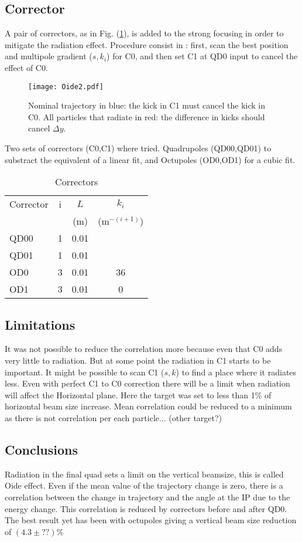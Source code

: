 \subsection{Corrector}
A pair of correctors, as in Fig. (\ref{f:corrector}), is added to the strong focusing in order to mitigate the radiation effect. Procedure consist in : first, scan the best position and multipole gradient ($s,k_i$) for C0, and then set C1 at QD0 input to cancel the effect of C0.\par
\begin{figure}[!htb]
\centering
\texttt{[image: Oide2.pdf]}\caption{Nominal trajectory in blue: the kick in C1 must cancel the kick in C0. All particles that radiate in red: the difference in kicks should cancel $\Delta y$.}\label{f:corrector}
\end{figure}
Two sets of correctors (C0,C1) where tried. Quadrupoles (QD00,QD01) to substract the equivalent of a linear fit, and Octupoles (OD0,OD1) for a cubic fit.
\begin{table}[!hbt]
\centering
\begin{tabular}{l||c|c|c}\hline\hline
Corrector & i & $L$ & $k_{i}$\\
& & (m)& (m$^{-(i+1)}$)\\\hline
QD00 & 1 & 0.01 &\\
QD01 & 1 & 0.01 &\\\hline
OD0 & 3 & 0.01 & 36\\
OD1 & 3 & 0.01 & 0\\\hline
\end{tabular}\caption{Correctors}\label{t:correctors}
\end{table}

\subsection{Limitations}
It was not possible to reduce the correlation more because even that C0 adds very little to radiation. But at some point the radiation in C1 starts to be important. It might be possible to scan  C1 ($s,k$) to find a place where it radiates less. Even with perfect C1 to C0 correction there will be a limit when radiation will affect the Horizontal plane. Here the target was set to less than 1\% of horizontal beam size increase. Mean correlation could be reduced to a minimum as there is not correlation per each particle... (other target?)

\subsection{Conclusions}
Radiation in the final quad sets a limit on the vertical beamsize, this is called Oide effect. Even if the mean value of the trajectory change is zero, there is a correlation between the change in trajectory and the angle at the IP due to the energy change. This correlation is reduced by correctors before and after QD0. The best result yet has been with octupoles giving a vertical beam size reduction of $(4.3\pm??)$\%
